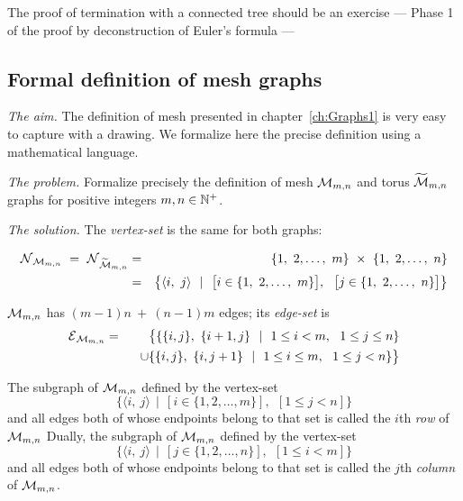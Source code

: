 {\Arny The proof of termination with a connected tree should be an
  exercise --- Phase 1 of the proof by deconstruction of Euler's
  formula} ---


\subsection{Formal definition of mesh graphs}
\label{Exercice:FormalDefinitionMesh}

\noindent \textit{The aim.}
The definition of mesh presented in chapter~\ref{ch:Graphs1}
is very easy to capture with a drawing.
We formalize here the precise definition using a mathematical language. 
\medskip

\noindent \textit{The problem.}
Formalize precisely the definition of mesh  $\mbox{$\cal M$}_{m,n}$ and torus $\widetilde{\mbox{$\cal M$}}_{m,n}$ graphs
for positive integers $m, n \in \mathbb{N}^+$.
\medskip

\noindent \textit{The solution.}
The  {\it vertex-set} is the same for both graphs:

\begin{eqnarray*}
\n_{\fm_{m,n}} \ = \ \n_{\widetilde{\fm}_{m,n}}
  & = & 
\{1, \ 2, \ldots, \ m\} \ \times \ \{1, \ 2, \ldots, \ n\} \\
  & = & 
\big\{ \langle i, \ j \rangle \ \ | \ \ 
\big[ i \in \{1, \ 2, \ldots, \ m\} \big], \ \
\big[ j \in \{1, \ 2, \ldots, \ n\} \big]
\big\}
\end{eqnarray*}


$\mbox{$\cal M$}_{m,n}$ has $(m-1)n \ + \ (n-1)m$ edges; its {\it edge-set} is
\begin{eqnarray*}
\mbox{$\cal E$}_{\mbox{{\scriptsize $\cal M$}}_{m,n}} & = & 
\big\{
\{ \{ i, j \}, \ \{ i+1, j \} \ \ | \ \
1 \leq i < m, \ \ 1 \leq j \leq n \} \\
  &  & \hspace*{.1in} \cup
\{ \{ i, j \}, \ \{ i, j+1 \} \ \ | \ \
1 \leq i \leq m, \ \ 1 \leq j < n \}
\big\}
\end{eqnarray*}

\medskip

The subgraph of $\mbox{$\cal M$}_{m,n}$ defined by the vertex-set
\[ \{ \langle i, \ j \rangle  \ \ | \ \ \left[i \in \{1, 2, \ldots,
  m\}\right], \ \ \left[1 \leq j < n\right]\}
\]
and all edges both of whose endpoints belong to that set is called the
$i$th {\it row} of $\mbox{$\cal M$}_{m,n}$
Dually, the subgraph of $\mbox{$\cal M$}_{m,n}$ defined by the vertex-set
\[ \{ \langle i, \ j \rangle  \ \ | \ \ \left[j \in \{1, 2, \ldots,
  n\}\right], \ \ \left[1 \leq i < m\right] \}
\]
and all edges both of whose endpoints belong to that set is called the
$j$th {\it column} of $\mbox{$\cal M$}_{m,n}$.



